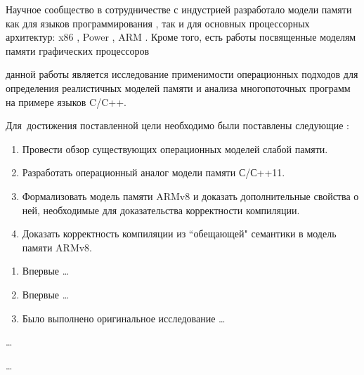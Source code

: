 {\progress}
Научное сообщество в сотрудничестве с индустрией разработало модели
памяти как для языков программирования
\cite{Batty-al:POPL11, Manson-al:POPL05},
так и для основных процессорных архитектур: 
x86 \cite{Sewell-al:CACM10},
Power \cite{Sarkar-al:PLDI11,Alglave-al:TOPLAS14},
ARM \cite{Flur-al:POPL16}.
Кроме того, есть работы посвященные моделям памяти графических
процессоров 



{\aim} данной работы является исследование применимости операционных
подходов для определения реалистичных моделей памяти и анализа
многопоточных программ на примере языков C/C++.

Для~достижения поставленной цели необходимо были поставлены следующие {\tasks}:
\begin{enumerate}
  \item Провести обзор существующих операционных моделей слабой памяти.
  \item Разработать операционный аналог модели памяти С/С++11.
  \item Формализовать модель памяти ARMv8 и доказать дополнительные свойства о ней, необходимые для
        доказательства корректности компиляции. 
  \item Доказать корректность компиляции из ``обещающей" \; семантики в модель памяти ARMv8.
\end{enumerate}

{\novelty}
\begin{enumerate}
  \item Впервые \ldots
  \item Впервые \ldots
  \item Было выполнено оригинальное исследование \ldots
\end{enumerate}

{\influence} \ldots

{\methods} \ldots

